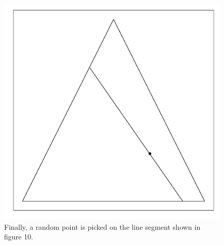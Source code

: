 \documentclass{article}\usepackage{graphicx, color}
\makeatletter
\def\maxwidth{ %
  \ifdim\Gin@nat@width>\linewidth
    \linewidth
  \else
    \Gin@nat@width
  \fi
}
\newenvironment{knitrout}{}{} %
\makeatother
\begin{document}
\begin{figure}[H]
\begin{knitrout}
\color{fgcolor}
\includegraphics[width=\maxwidth]{figure/hitandrun_walkthrough6} 

\end{knitrout}

\caption{Finally, a random point is picked on the line segment shown in figure 10.}
\end{figure}
\end{document}
